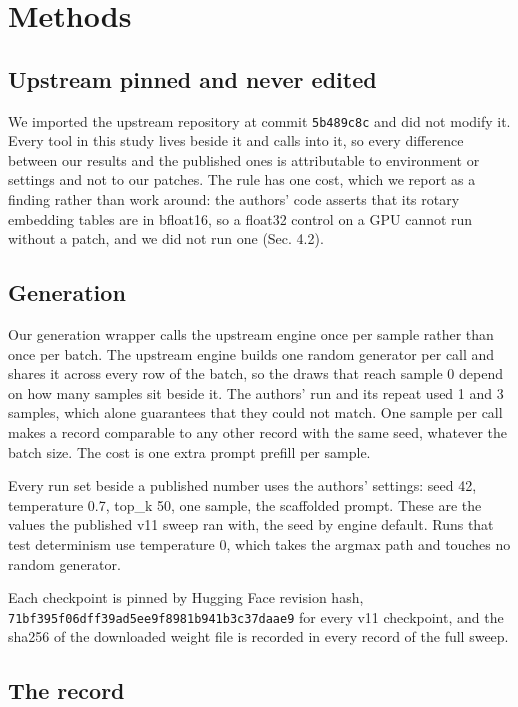 \documentclass[reprint,prx,amsmath,amssymb,aps,superscriptaddress]{revtex4-2}
\begin{document}
\section{Methods}

\subsection{Upstream pinned and never edited}

We imported the upstream repository at commit \texttt{5b489c8c} and did not modify it. Every tool in this study lives beside it and calls into it, so every difference between our results and the published ones is attributable to environment or settings and not to our patches. The rule has one cost, which we report as a finding rather than work around: the authors' code asserts that its rotary embedding tables are in bfloat16, so a float32 control on a GPU cannot run without a patch, and we did not run one (Sec. 4.2).

\subsection{Generation}

Our generation wrapper calls the upstream engine once per sample rather than once per batch. The upstream engine builds one random generator per call and shares it across every row of the batch, so the draws that reach sample 0 depend on how many samples sit beside it. The authors' run and its repeat used 1 and 3 samples, which alone guarantees that they could not match. One sample per call makes a record comparable to any other record with the same seed, whatever the batch size. The cost is one extra prompt prefill per sample.

Every run set beside a published number uses the authors' settings: seed 42, temperature 0.7, top\_k 50, one sample, the scaffolded prompt. These are the values the published v11 sweep ran with, the seed by engine default. Runs that test determinism use temperature 0, which takes the argmax path and touches no random generator.

Each checkpoint is pinned by Hugging Face revision hash, \texttt{71bf395f06dff39ad5ee9f8981b941b3c37daae9} for every v11 checkpoint, and the sha256 of the downloaded weight file is recorded in every record of the full sweep.

\subsection{The record}
\end{document}
